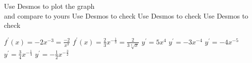 \begin{Answer}[ref={exFirstPrinciples}]
\Question %
\begin{tasks}
\end{tasks}

\Question Use Desmos to plot the graph \\and compare to yours
\Question Use Desmos to check
\Question Use Desmos to check
\Question Use Desmos to check

\Question %
\begin{tasks}
	\task $f^{ \prime } (x) = -2 x^{ -3} =\frac{ -2}{x^{3}}$
	\task $f^{ \prime } \left (x\right ) =\frac{2}{3} x^{ -\frac{1}{3}} =\frac{2}{3 \sqrt[{3}]{x}}$ 
	\task $y^{ \prime } =5 x^{4}$
	\task $y^{ \prime } = -3 x^{ -4}$
	\task $y^{ \prime } = -4 x^{ -5}$
	\task $y^{ \prime } =\frac{3}{4} x^{ -\frac{1}{4}}$
	\task $y^{ \prime } = -\frac{1}{2} x^{ -\frac{3}{2}}$
	
\end{tasks}
\end{Answer}%

